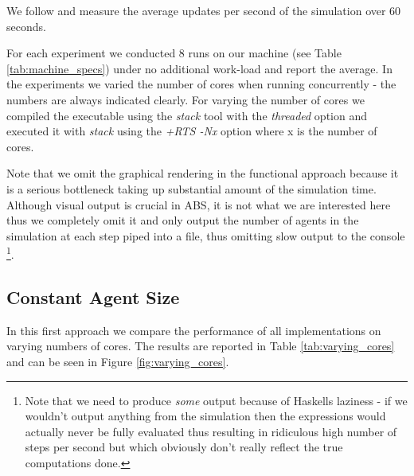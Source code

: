 We follow \cite{lysenko_framework_2008} and measure the average updates per second of the simulation over 60 seconds.

For each experiment we conducted 8 runs on our machine (see Table \ref{tab:machine_specs}) under no additional work-load and report the average. In the experiments we varied the number of cores when running concurrently - the numbers are always indicated clearly. For varying the number of cores we compiled the executable using the \textit{stack} tool with the \textit{threaded} option and executed it with \textit{stack} using the \textit{+RTS -Nx} option where x is the number of cores.

Note that we omit the graphical rendering in the functional approach because it is a serious bottleneck taking up substantial amount of the simulation time. Although visual output is crucial in ABS, it is not what we are interested here thus we completely omit it and only output the number of agents in the simulation at each step piped into a file, thus omitting slow output to the console \footnote{Note that we need to produce \textit{some} output because of Haskells laziness - if we wouldn't output anything from the simulation then the expressions would actually never be fully evaluated thus resulting in ridiculous high number of steps per second but which obviously don't really reflect the true computations done.}.

\subsection{Constant Agent Size}
In this first approach we compare the performance of all implementations on varying numbers of cores. The results are reported in Table \ref{tab:varying_cores} and can be seen in Figure \ref{fig:varying_cores}. 

